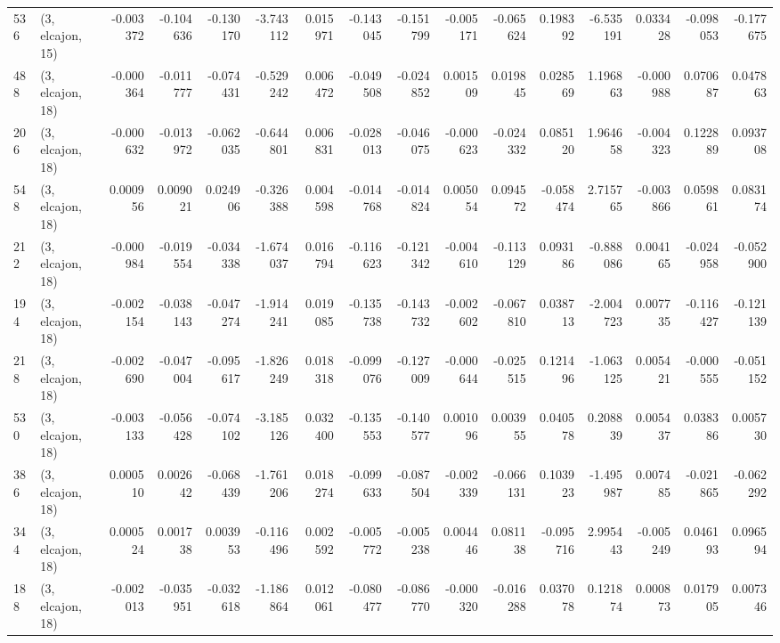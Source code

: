 \begin{tabular}{llrrrrrrrrrrrrrr}
536 &  (3, elcajon, 15) &  -0.003372 & -0.104636 & -0.130170 &   -3.743112 &  0.015971 &  -0.143045 & -0.151799 & -0.005171 & -0.065624 &  0.198392 &   -6.535191 &  0.033428 & -0.098053 & -0.177675 \\
488 &  (3, elcajon, 18) &  -0.000364 & -0.011777 & -0.074431 &   -0.529242 &  0.006472 &  -0.049508 & -0.024852 &  0.001509 &  0.019845 &  0.028569 &    1.196863 & -0.000988 &  0.070687 &  0.047863 \\
206 &  (3, elcajon, 18) &  -0.000632 & -0.013972 & -0.062035 &   -0.644801 &  0.006831 &  -0.028013 & -0.046075 & -0.000623 & -0.024332 &  0.085120 &    1.964658 & -0.004323 &  0.122889 &  0.093708 \\
548 &  (3, elcajon, 18) &   0.000956 &  0.009021 &  0.024906 &   -0.326388 &  0.004598 &  -0.014768 & -0.014824 &  0.005054 &  0.094572 & -0.058474 &    2.715765 & -0.003866 &  0.059861 &  0.083174 \\
212 &  (3, elcajon, 18) &  -0.000984 & -0.019554 & -0.034338 &   -1.674037 &  0.016794 &  -0.116623 & -0.121342 & -0.004610 & -0.113129 &  0.093186 &   -0.888086 &  0.004165 & -0.024958 & -0.052900 \\
194 &  (3, elcajon, 18) &  -0.002154 & -0.038143 & -0.047274 &   -1.914241 &  0.019085 &  -0.135738 & -0.143732 & -0.002602 & -0.067810 &  0.038713 &   -2.004723 &  0.007735 & -0.116427 & -0.121139 \\
218 &  (3, elcajon, 18) &  -0.002690 & -0.047004 & -0.095617 &   -1.826249 &  0.018318 &  -0.099076 & -0.127009 & -0.000644 & -0.025515 &  0.121496 &   -1.063125 &  0.005421 & -0.000555 & -0.051152 \\
530 &  (3, elcajon, 18) &  -0.003133 & -0.056428 & -0.074102 &   -3.185126 &  0.032400 &  -0.135553 & -0.140577 &  0.001096 &  0.003955 &  0.040578 &    0.208839 &  0.005437 &  0.038386 &  0.005730 \\
386 &  (3, elcajon, 18) &   0.000510 &  0.002642 & -0.068439 &   -1.761206 &  0.018274 &  -0.099633 & -0.087504 & -0.002339 & -0.066131 &  0.103923 &   -1.495987 &  0.007485 & -0.021865 & -0.062292 \\
344 &  (3, elcajon, 18) &   0.000524 &  0.001738 &  0.003953 &   -0.116496 &  0.002592 &  -0.005772 & -0.005238 &  0.004446 &  0.081138 & -0.095716 &    2.995443 & -0.005249 &  0.046193 &  0.096594 \\
188 &  (3, elcajon, 18) &  -0.002013 & -0.035951 & -0.032618 &   -1.186864 &  0.012061 &  -0.080477 & -0.086770 & -0.000320 & -0.016288 &  0.037078 &    0.121874 &  0.000873 &  0.017905 &  0.007346 \\

\end{tabular}
